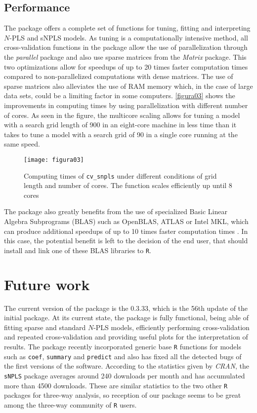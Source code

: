 \subsection{Performance}
The package offers a complete set of functions for tuning, fitting and interpreting $N$-PLS and sNPLS models. As tuning is a computationally intensive method, all cross-validation functions in the package allow the use of parallelization through the \textit{parallel} package and also use sparse matrices from the \textit{Matrix} package. This two optimizations allow for speedups of up to 20 times faster computation times compared to non-parallelized computations with dense matrices. The use of sparse matrices also alleviates the use of RAM memory which, in the case of large data sets, could be a limiting factor in some computers. \autoref{figura03} shows the improvements in computing times by using parallelization with different number of cores. As seen in the figure, the multicore scaling allows for tuning a model with a search grid length of 900 in an eight-core machine in less time than it takes to tune a model with a search grid of 90 in a single core running at the same speed.

\begin{figure}[hbtp]
	\centering
\texttt{[image: figura03]}
\caption[Computing times of \texttt{cv\_snpls} under different conditions of grid length and number of cores]{Computing times of \texttt{cv\_snpls} under different conditions of grid length and number of cores. The function scales efficiently up until 8 cores}
\label{figura03}
\end{figure}

The package also greatly benefits from the use of specialized Basic Linear Algebra Subprograms (BLAS) such as OpenBLAS, ATLAS or Intel\textsuperscript{\tiny\textregistered}  MKL, which can produce additional speedups of up to 10 times faster computation times \parencite{xianyi2014openblas, wang2014intel}. In this case, the potential benefit is left to the decision of the end user, that should install and link one of these BLAS libraries to \texttt{R}.

\section{Future work}
\label{packagedev}
The current version of the package is the 0.3.33, which is the 56th update of the initial package. At its current state, the package is fully functional, being able of fitting sparse and standard $N$-PLS models, efficiently performing cross-validation and repeated cross-validation and providing useful plots for the interpretation of results. The package recently incorporated generic base \texttt{R} functions for models such as \texttt{coef}, \texttt{summary} and \texttt{predict} and also has fixed all the detected bugs of the first versions of the software. According to the statistics given by \textit{CRAN}, the \texttt{sNPLS} package averages around 240 downloads per month and has accumulated more than 4500 downloads. These are similar statistics to the two other \texttt{R} packages for three-way analysis, so reception of our package seems to be great among the three-way community of \texttt{R} users.

